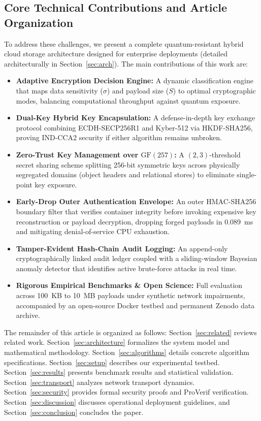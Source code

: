 \documentclass[pdflatex,sn-mathphys,Numbered]{sn-jnl}%
\theoremstyle{thmstyleone}%
\theoremstyle{thmstyletwo}%
\theoremstyle{thmstylethree}%
\begin{document}
\subsection{\textbf{Core Technical Contributions and Article Organization}}
To address these challenges, we present a complete quantum-resistant hybrid cloud storage architecture designed for enterprise deployments (detailed architecturally in Section~\ref{sec:arch}). The main contributions of this work are:
\begin{itemize}
    \item \textbf{Adaptive Encryption Decision Engine:} A dynamic classification engine that maps data sensitivity ($\sigma$) and payload size ($S$) to optimal cryptographic modes, balancing computational throughput against quantum exposure.
    \item \textbf{Dual-Key Hybrid Key Encapsulation:} A defense-in-depth key exchange protocol combining ECDH-SECP256R1 and Kyber-512 via HKDF-SHA256, proving IND-CCA2 security if either algorithm remains unbroken.
    \item \textbf{Zero-Trust Key Management over $\text{GF}(257)$:} A $(2,3)$-threshold secret sharing scheme splitting 256-bit symmetric keys across physically segregated domains (object headers and relational stores) to eliminate single-point key exposure.
    \item \textbf{Early-Drop Outer Authentication Envelope:} An outer HMAC-SHA256 boundary filter that verifies container integrity before invoking expensive key reconstruction or payload decryption, dropping forged payloads in 0.089~ms and mitigating denial-of-service CPU exhaustion.
    \item \textbf{Tamper-Evident Hash-Chain Audit Logging:} An append-only cryptographically linked audit ledger coupled with a sliding-window Bayesian anomaly detector that identifies active brute-force attacks in real time.
    \item \textbf{Rigorous Empirical Benchmarks \& Open Science:} Full evaluation across 100~KB to 10~MB payloads under synthetic network impairments, accompanied by an open-source Docker testbed and permanent Zenodo data archive.
\end{itemize}

The remainder of this article is organized as follows: Section~\ref{sec:related} reviews related work. Section~\ref{sec:architecture} formalizes the system model and mathematical methodology. Section~\ref{sec:algorithms} details concrete algorithm specifications. Section~\ref{sec:setup} describes our experimental testbed. Section~\ref{sec:results} presents benchmark results and statistical validation. Section~\ref{sec:transport} analyzes network transport dynamics. Section~\ref{sec:security} provides formal security proofs and ProVerif verification. Section~\ref{sec:discussion} discusses operational deployment guidelines, and Section~\ref{sec:conclusion} concludes the paper.
\end{document}
